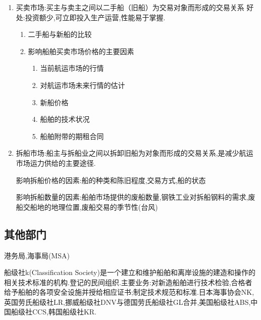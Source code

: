 \documentclass[UTF8,a4paper]{ctexart}
\begin{document}
\begin{enumerate}[1)]
			
			\item 买卖市场:买主与卖主之间以二手船（旧船）为交易对象而形成的交易关系
			好处:投资额少,可立即投入生产运营,性能易于掌握.
				\begin{enumerate}[.]
					\item 二手船与新船的比较
					\item 影响船舶买卖市场价格的主要因素
						\begin{enumerate}[-]
							\item 当前航运市场的行情
							\item 对航运市场未来行情的估计
							\item 新船价格
							\item 船舶的技术状况
							\item 船舶附带的期租合同
						\end{enumerate}
				\end{enumerate}
			
			\item 拆船市场:船主与拆船业之间以拆卸旧船为对象而形成的交易关系,是减少航运市场运力供给的主要途径.
			
			影响拆船价格的因素:船的种类和陈旧程度,交易方式,船的状态
			
			影响拆船数量的因素:船舶市场提供的废船数量,钢铁工业对拆船钢料的需求,废船交船地的地理位置,废船交易的季节性(台风)
		\end{enumerate}
	
		\subsection{其他部门}			
			 港务局,海事局(MSA)
			 
			 船级社k(Classification Society)是一个建立和维护船舶和离岸设施的建造和操作的相关技术标准的机构.登记的民间组织.主要业务:对新造船舶进行技术检验,合格者给予船舶的各项安全设施并授给相应证书;制定技术规范和标准.日本海事协会NK,英国劳氏船级社LR,挪威船级社DNV与德国劳氏船级社GL合并,美国船级社ABS,中国船级社CCS,韩国船级社KR.
\end{document}
